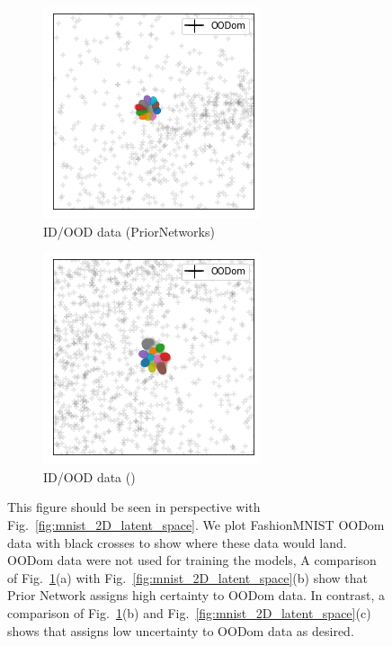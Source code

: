 
\begin{figure}[t!]
    \centering
    \begin{subfigure}[t]{0.46 \columnwidth}
        \centering
        \includegraphics[width=0.5 \textwidth]{sections/006_neurips2020/figures/2D_latent_klpn_3.png}
         \caption{ID/OOD data (PriorNetworks)}
    \end{subfigure}%
    \begin{subfigure}[t]{0.46 \columnwidth}
        \centering
        \includegraphics[width=0.5 \textwidth]{sections/006_neurips2020/figures/2D_latent_ours_bn_3.png}
         \caption{ID/OOD data (\PostNetacro)}
    \end{subfigure}%
    \caption{This figure should be seen in perspective with Fig.~\ref{fig:mnist_2D_latent_space}. We plot FashionMNIST OODom data with black crosses to show where these data would land. OODom data were not used for training the models, A comparison of Fig.~\ref{fig:mnist_2D_latent_space_2}(a) with Fig.~\ref{fig:mnist_2D_latent_space}(b) show that Prior Network assigns high certainty to OODom data. In contrast, a comparison of Fig.~\ref{fig:mnist_2D_latent_space_2}(b) and Fig.~\ref{fig:mnist_2D_latent_space}(c) shows that \PostNet assigns low uncertainty to OODom data as desired.}
    \label{fig:mnist_2D_latent_space_2}
\end{figure}

